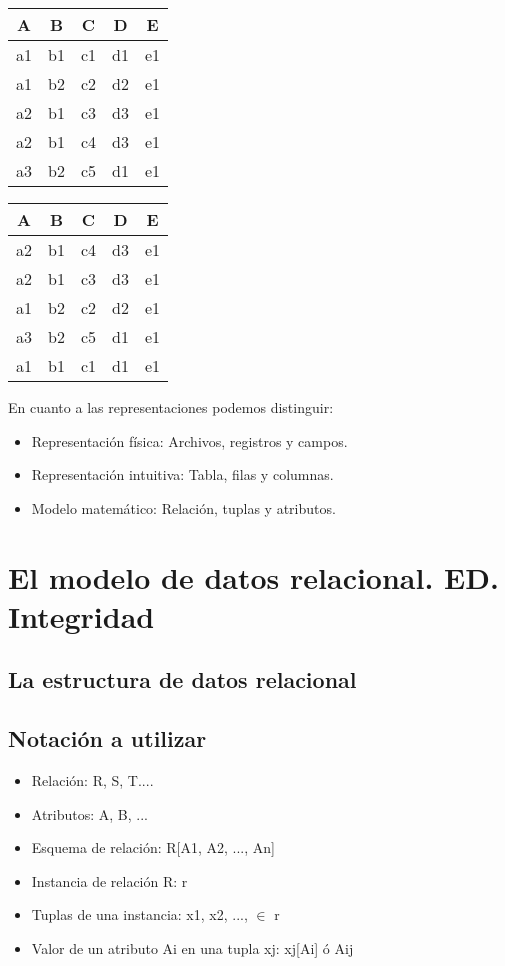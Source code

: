 \begin{table}[h!]
\centering
\begin{tabular}{|c|c|c|c|c|}
\hline
A & B & C & D & E \\ \hline
a1 & b1 & c1 & d1 & e1 \\ \hline
a1 & b2 & c2 & d2 & e1 \\ \hline
a2 & b1 & c3 & d3 & e1 \\ \hline
a2 & b1 & c4 & d3 & e1 \\ \hline
a3 & b2 & c5 & d1 & e1 \\ \hline
\end{tabular}
\end{table}

\begin{table}[h!]
\centering
\begin{tabular}{|c|c|c|c|c|}
\hline
A & B & C & D & E \\ \hline
a2 & b1 & c4 & d3 & e1 \\ \hline
a2 & b1 & c3 & d3 & e1 \\ \hline
a1 & b2 & c2 & d2 & e1 \\ \hline
a3 & b2 & c5 & d1 & e1 \\ \hline
a1 & b1 & c1 & d1 & e1 \\ \hline
\end{tabular}
\end{table}

En cuanto a las representaciones podemos distinguir:
\begin{itemize}
    \item Representación física: Archivos, registros y campos.
    \item Representación intuitiva: Tabla, filas y columnas.
    \item Modelo matemático: Relación, tuplas y atributos.
\end{itemize}

\section{El modelo de datos relacional. ED. Integridad}
\subsection{La estructura de datos relacional}

\subsection*{Notación a utilizar}
\begin{itemize}
    \item Relación: R, S, T....
    \item Atributos: A, B, ...
    \item Esquema de relación: R[A1, A2, ..., An]
    \item Instancia de relación R: r
    \item Tuplas de una instancia: x1, x2, ..., $\in$ r
    \item Valor de un atributo Ai en una tupla xj: xj[Ai] ó Aij
\end{itemize}

